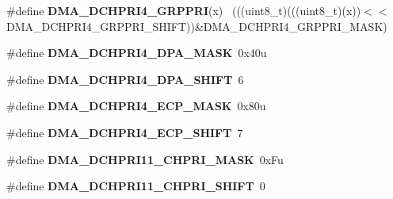 \begin{DoxyCompactItemize}
\item 
\hypertarget{group___d_m_a___register___masks_ga206113dbc85c0dfc31add2e1c8604c10}{}\#define {\bfseries D\+M\+A\+\_\+\+D\+C\+H\+P\+R\+I4\+\_\+\+G\+R\+P\+P\+R\+I}(x)                                    ~(((uint8\+\_\+t)(((uint8\+\_\+t)(x))$<$$<$D\+M\+A\+\_\+\+D\+C\+H\+P\+R\+I4\+\_\+\+G\+R\+P\+P\+R\+I\+\_\+\+S\+H\+I\+F\+T))\&D\+M\+A\+\_\+\+D\+C\+H\+P\+R\+I4\+\_\+\+G\+R\+P\+P\+R\+I\+\_\+\+M\+A\+S\+K)\label{group___d_m_a___register___masks_ga206113dbc85c0dfc31add2e1c8604c10}

\item 
\hypertarget{group___d_m_a___register___masks_gaf4a7bab4a376e47cbcc44e02cff09748}{}\#define {\bfseries D\+M\+A\+\_\+\+D\+C\+H\+P\+R\+I4\+\_\+\+D\+P\+A\+\_\+\+M\+A\+S\+K}~0x40u\label{group___d_m_a___register___masks_gaf4a7bab4a376e47cbcc44e02cff09748}

\item 
\hypertarget{group___d_m_a___register___masks_ga62b07715af664512e04bc2b02ca12993}{}\#define {\bfseries D\+M\+A\+\_\+\+D\+C\+H\+P\+R\+I4\+\_\+\+D\+P\+A\+\_\+\+S\+H\+I\+F\+T}~6\label{group___d_m_a___register___masks_ga62b07715af664512e04bc2b02ca12993}

\item 
\hypertarget{group___d_m_a___register___masks_ga1d848e32bb5131ea22811b9165d83d44}{}\#define {\bfseries D\+M\+A\+\_\+\+D\+C\+H\+P\+R\+I4\+\_\+\+E\+C\+P\+\_\+\+M\+A\+S\+K}~0x80u\label{group___d_m_a___register___masks_ga1d848e32bb5131ea22811b9165d83d44}

\item 
\hypertarget{group___d_m_a___register___masks_gac5f10de0dfe7e5561053741e9e38e371}{}\#define {\bfseries D\+M\+A\+\_\+\+D\+C\+H\+P\+R\+I4\+\_\+\+E\+C\+P\+\_\+\+S\+H\+I\+F\+T}~7\label{group___d_m_a___register___masks_gac5f10de0dfe7e5561053741e9e38e371}

\item 
\hypertarget{group___d_m_a___register___masks_ga4b7b6d2e60a016af53e079b20cad7b99}{}\#define {\bfseries D\+M\+A\+\_\+\+D\+C\+H\+P\+R\+I11\+\_\+\+C\+H\+P\+R\+I\+\_\+\+M\+A\+S\+K}~0x\+Fu\label{group___d_m_a___register___masks_ga4b7b6d2e60a016af53e079b20cad7b99}

\item 
\hypertarget{group___d_m_a___register___masks_ga832f65fc63433161ecd5d5ffdfbd125d}{}\#define {\bfseries D\+M\+A\+\_\+\+D\+C\+H\+P\+R\+I11\+\_\+\+C\+H\+P\+R\+I\+\_\+\+S\+H\+I\+F\+T}~0\label{group___d_m_a___register___masks_ga832f65fc63433161ecd5d5ffdfbd125d}


\end{DoxyCompactItemize}
